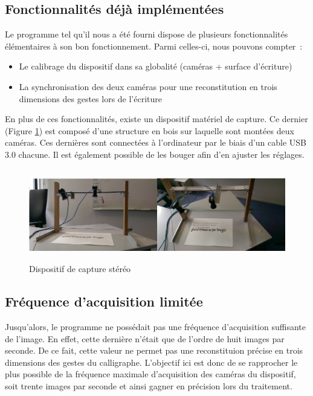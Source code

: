 \subsection{Fonctionnalités déjà implémentées}

Le programme tel qu'il nous a été fourni dispose de plusieurs fonctionnalités élémentaires à son bon fonctionnement. Parmi celles-ci, nous pouvons compter~:
\begin{itemize}
\item Le calibrage du dispositif dans sa globalité (caméras + surface d'écriture)
\item La synchronisation des deux caméras pour une reconstitution en trois dimensions des gestes lors de l'écriture
\end{itemize}
En plus de ces fonctionnalités, existe un dispositif matériel de capture. Ce dernier (Figure \ref{cameras}) est composé d'une structure en bois sur laquelle sont montées deux caméras. Ces dernières sont connectées à l'ordinateur par le biais d'un cable USB 3.0 chacune. Il est également possible de les bouger afin d'en ajuster les réglages.

\begin{figure}[!h]
\centering
\includegraphics[width=\textwidth, height=4cm]{Modules/Picture/camerasPic.png}
\caption{Dispositif de capture stéréo}
\label{cameras}
\end{figure}

\subsection{Fréquence d'acquisition limitée}

Jusqu'alors, le programme ne possédait pas une fréquence d'acquisition suffisante de l'image. En effet, cette dernière n'était que de l'ordre de huit images par seconde. De ce fait, cette valeur ne permet pas une reconstituion précise en trois dimensions des gestes du calligraphe. L'objectif ici est donc de se rapprocher le plus possible de la fréquence maximale d'acquisition des caméras du dispositif, soit trente images par seconde et ainsi gagner en précision lors du traitement.

